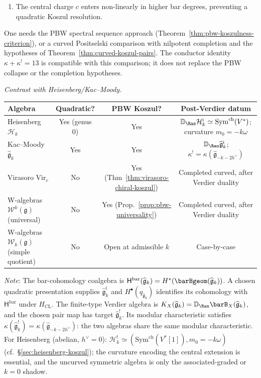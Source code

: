 \begin{remark}
\begin{enumerate}
\item The central charge $c$ enters non-linearly in higher bar degrees, preventing a quadratic Koszul resolution.
\end{enumerate}
One needs the PBW spectral sequence approach
(Theorem~\ref{thm:pbw-koszulness-criterion}), or a curved
Positselski comparison with nilpotent completion and the hypotheses of
Theorem~\ref{thm:curved-koszul-pairs}. The conductor identity
$\kappa+\kappa^!=13$ is compatible with this comparison; it does not
replace the PBW collapse or the completion hypotheses.

\emph{Contrast with Heisenberg/Kac--Moody.}
\begin{center}
\begin{tabular}{|l|c|c|c|}
\hline
\textbf{Algebra} & \textbf{Quadratic?} & \textbf{PBW Koszul?} & \textbf{Post-Verdier datum} \\
\hline
Heisenberg $\mathcal{H}_k$ & Yes (genus 0) & Yes & $\mathbb D_{\Ran}\mathcal H_k^{\mathrm i}\simeq\mathrm{Sym}^{\mathrm{ch}}(V^*)$; curvature $m_0=-k\omega$ \\
Kac--Moody $\widehat{\mathfrak{g}}_k$ & Yes & Yes & $\mathbb D_{\Ran}\widehat{\mathfrak{g}}_k^{\mathrm i}$; $\kappa^!=\kappa(\widehat{\mathfrak{g}}_{-k-2h^\vee})$ \\
Virasoro $\text{Vir}_c$ & No & Yes (Thm~\ref{thm:virasoro-chiral-koszul}) & Completed curved, after Verdier duality \\
W-algebras $\mathcal{W}^k(\mathfrak{g})$ (universal) & No & Yes (Prop.~\ref{prop:pbw-universality}) & Completed curved, after Verdier duality \\
W-algebras $\mathcal{W}_k(\mathfrak{g})$ (simple quotient) & No & Open at admissible $k$ & Case-by-case \\
\hline
\end{tabular}
\end{center}

\emph{Note}: The bar-cohomology coalgebra is
$\mathsf H^{\mathrm{bar}}(\widehat{\mathfrak g}_k)
=H^*(\barBgeom(\widehat{\mathfrak{g}}_k))$.  A chosen quadratic
presentation supplies
$\widehat{\mathfrak g}_k^{\mathrm i}$ and
$H^\bullet(q_{\widehat{\mathfrak g}_k})$ identifies its cohomology
with $\mathsf H^{\mathrm{bar}}$ under $H_{\mathrm{CL}}$.  The
finite-type Verdier algebra is
$K_X(\widehat{\mathfrak g}_k)=\mathbb D_{\Ran}
\barB_X(\widehat{\mathfrak g}_k)$, and the chosen pair map has target
$\widehat{\mathfrak g}_k^!$.  Its modular characteristic satisfies
$\kappa(\widehat{\mathfrak{g}}_k^!) =
\kappa(\widehat{\mathfrak{g}}_{-k-2h^\vee})$: the two algebras share
the same modular characteristic. For
Heisenberg (abelian, $h^\vee = 0$):
$\mathcal{H}_k^!
\simeq(\mathrm{Sym}^{\mathrm{ch}}(V^*[1]),m_0=-k\omega)$
(cf.\ \S\ref{sec:heisenberg-koszul}); the curvature encoding the
central extension is essential, and the uncurved symmetric algebra is
only the associated-graded or \(k=0\) shadow.
\end{remark}

